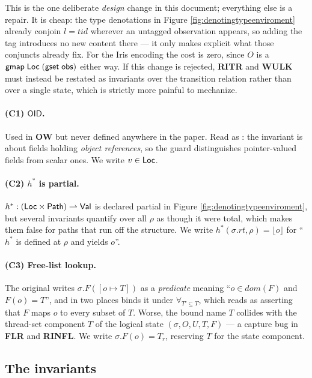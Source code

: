 This is the one deliberate \emph{design} change in this document; everything
else is a repair.  It is cheap: the type denotations in Figure
\ref{fig:denotingtypeenviroment} already conjoin $l = \mathit{tid}$ wherever an
untagged observation appears, so adding the tag introduces no new content
there --- it only makes explicit what those conjuncts already fix.  For the Iris
encoding the cost is zero, since $O$ is a $\textsf{gmap}\;\textsf{Loc}\;(\textsf{gset}\;\textsf{obs})$
either way.  If this change is rejected, \textbf{RITR} and \textbf{WULK} must
instead be restated as invariants over the transition relation rather than over
a single state, which is strictly more painful to mechanize.

\paragraph{(C1) $\textsf{OID}$.}
Used in \textbf{OW} but never defined anywhere in the paper.  Read as \Loc:
the invariant is about fields holding \emph{object references}, so the guard
distinguishes pointer-valued fields from scalar ones.  We write $v\in\textsf{Loc}$.

\paragraph{(C2) $h^{*}$ is partial.}
$h^{*} : (\textsf{Loc}\times\textsf{Path}) \rightharpoonup \textsf{Val}$ is declared
partial in Figure \ref{fig:denotingtypeenviroment}, but several invariants
quantify over all $\rho$ as though it were total, which makes them false for
paths that run off the structure.  We write $h^{*}(\sigma.rt,\rho) = \lfloor o
\rfloor$ for ``$h^{*}$ is defined at $\rho$ and yields $o$''.

\paragraph{(C3) Free-list lookup.}
The original writes $\sigma.F([o\mapsto T])$ as a \emph{predicate} meaning
``$o\in dom(F)$ and $F(o)=T$'', and in two places binds it under
$\forall_{T'\subseteq T}$, which reads as asserting that $F$ maps $o$ to every
subset of $T$.  Worse, the bound name $T$ collides with the thread-set component
$T$ of the logical state $(\sigma,O,U,T,F)$ --- a capture bug in \textbf{FLR}
and \textbf{RINFL}.  We write $\sigma.F(o) = T_{r}$, reserving $T$ for the
state component.

\subsection{The invariants}
\label{sec:inv-list}


